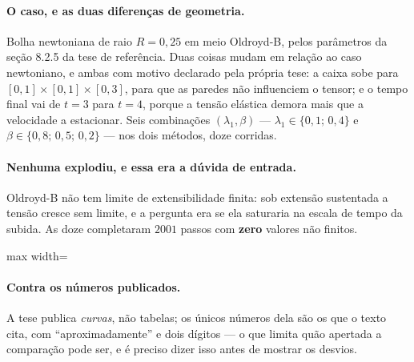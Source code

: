 \paragraph{O caso, e as duas diferen\c{c}as de geometria.} Bolha newtoniana de
raio $R=0{,}25$ em meio Oldroyd-B, pelos par\^ametros da se\c{c}\~ao 8.2.5 da
tese de refer\^encia. Duas coisas mudam em rela\c{c}\~ao ao caso newtoniano, e
ambas com motivo declarado pela pr\'opria tese: a caixa sobe para
$[0,1]\times[0,1]\times[0,3]$, para que as paredes n\~ao influenciem o tensor; e
o tempo final vai de $t=3$ para $t=4$, porque a tens\~ao el\'astica demora mais
que a velocidade a estacionar. Seis combina\c{c}\~oes
$(\lambda_1, \beta)$ --- $\lambda_1 \in \{0{,}1;\,0{,}4\}$ e
$\beta \in \{0{,}8;\,0{,}5;\,0{,}2\}$ --- nos dois m\'etodos, doze corridas.

\paragraph{Nenhuma explodiu, e essa era a d\'uvida de entrada.} Oldroyd-B n\~ao
tem limite de extensibilidade finita: sob extens\~ao sustentada a tens\~ao cresce
sem limite, e a pergunta era se ela saturaria na escala de tempo da subida. As
doze completaram $2001$ passos com \textbf{zero} valores n\~ao finitos.

\begin{adjustbox}{max width=\linewidth}
\end{adjustbox}

\paragraph{Contra os n\'umeros publicados.} A tese publica \emph{curvas}, n\~ao
tabelas; os \'unicos n\'umeros dela s\~ao os que o texto cita, com
``aproximadamente'' e dois d\'igitos --- o que limita qu\~ao apertada a
compara\c{c}\~ao pode ser, e \'e preciso dizer isso antes de mostrar os desvios.

